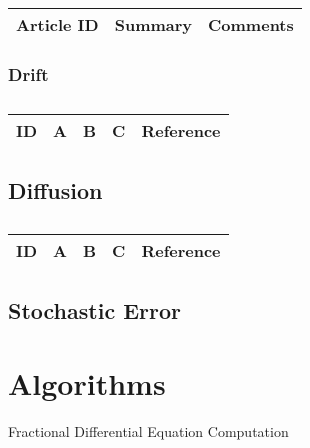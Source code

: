 \begin{table}[H]\centering
	\begin{tabular}{p{1cm}p{4cm}p{3cm}}
		Article ID & Summary & Comments\\
		\hline
		\hline
	\end{tabular}
\end{table}

\subsubsection{Drift}

\centering
\begin{table}[H]\footnotesize
	\caption{}
	\begin{tabular}{rp{1cm}p{2cm}p{3cm}p{1cm}}
		\hline
		ID & A & B & C & Reference \\
		\hline
		\hline
	\end{tabular}
\end{table}
\raggedright

\subsection{Diffusion}

\centering
\begin{table}[H]\footnotesize
	\caption{}
	\begin{tabular}{rp{1cm}p{2cm}p{3cm}p{1cm}}
		\hline
		ID & A & B & C & Reference \\
		\hline
		\hline
	\end{tabular}
\end{table}
\raggedright

\subsection{Stochastic Error}


\section{Algorithms}
\begin{algorithm}[H]
\begin{algorithmic}[1]
\end{algorithmic}
\caption{Fractional Differential Equation Computation}
	\label{Algorithm_1}
\end{algorithm}

